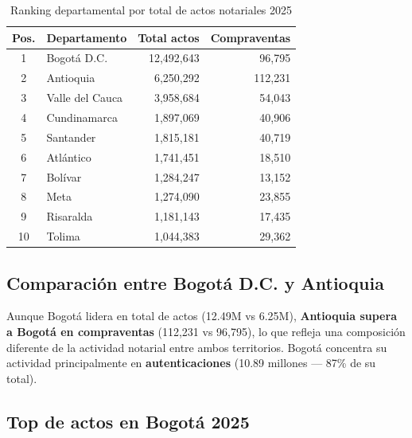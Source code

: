\documentclass{article}
\begin{document}
\begin{table}[H]
\centering
\begin{tabular}{clrr}
\toprule
\textbf{Pos.} & \textbf{Departamento} & 
\textbf{Total actos} & \textbf{Compraventas} \\
\midrule
1  & Bogotá D.C.     & 12,492,643 &  96,795 \\
2  & Antioquia       &  6,250,292 & 112,231 \\
3  & Valle del Cauca &  3,958,684 &  54,043 \\
4  & Cundinamarca    &  1,897,069 &  40,906 \\
5  & Santander       &  1,815,181 &  40,719 \\
6  & Atlántico       &  1,741,451 &  18,510 \\
7  & Bolívar         &  1,284,247 &  13,152 \\
8  & Meta            &  1,274,090 &  23,855 \\
9  & Risaralda       &  1,181,143 &  17,435 \\
10 & Tolima          &  1,044,383 &  29,362 \\
\bottomrule
\end{tabular}
\caption{Ranking departamental por total de actos 
notariales 2025}
\end{table}

\subsection{Comparación entre Bogotá D.C. y Antioquia}

Aunque Bogotá lidera en total de actos (12.49M vs 6.25M), 
\textbf{Antioquia supera a Bogotá en compraventas} 
(112,231 vs 96,795), lo que refleja una composición diferente de la actividad notarial entre ambos territorios. 
Bogotá concentra su actividad principalmente en 
\textbf{autenticaciones} (10.89 millones — 87\% 
de su total).

\subsection{Top de actos en Bogotá 2025}
\end{document}
